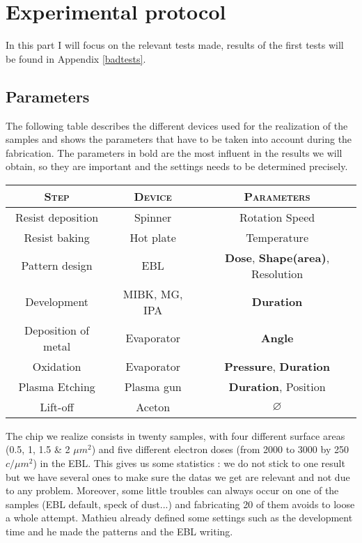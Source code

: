 \chapter{Experimental protocol}
\label{Chap3}

In this part I will focus on the relevant tests made, results of the first tests will be found in Appendix \ref{badtests}.

    \section{Parameters}
    
        The following table describes the different devices used for the realization of the samples and shows the parameters that have to be taken into account during the fabrication. The parameters in bold are the most influent in the results we will obtain, so they are important and the settings needs to be determined precisely.
        
       \vspace{0.5cm}
         
        \begin{tabular}{|c|c|c|}
        \hline
        \textsc{Step}&\textsc{Device}&\textsc{Parameters}\\
        \hline
        Resist deposition&Spinner&Rotation Speed\\
        \hline
        Resist baking&Hot plate&Temperature\\
        \hline
        Pattern design&EBL&\textbf{Dose}, \textbf{Shape(area)}, Resolution\\
        \hline
        Development&MIBK, MG, IPA&\textbf{Duration}\\ 
        \hline
        Deposition of metal&Evaporator&\textbf{Angle}\\
        \hline
        Oxidation&Evaporator&\textbf{Pressure}, \textbf{Duration}\\
        \hline
        Plasma Etching&Plasma gun&\textbf{Duration}, Position\\
        \hline
        Lift-off&Aceton&$\varnothing$ \\
        \hline
        \end{tabular}
        
        \vspace{0.5cm}
        
            
            The chip we realize consists in twenty samples, with four different surface areas (0.5, 1, 1.5 \& 2 $\mu m^2$) and five different electron doses (from 2000 to 3000 by 250 $c/\mu m^2$) in the EBL. This gives us some statistics : we do not stick to one result but we have several ones to make sure the datas we get are relevant and not due to any problem. Moreover, some little troubles can always occur on one of the samples (EBL default, speck of dust...) and fabricating 20 of them avoids to loose a whole attempt. Mathieu already defined some settings such as the development time and he made the patterns and the EBL writing.
                        

